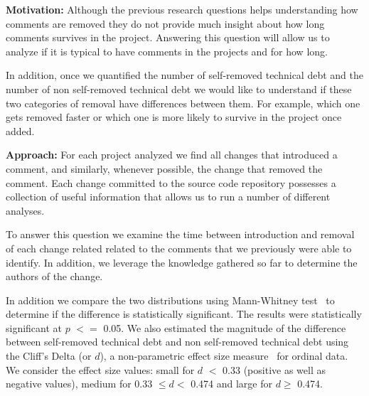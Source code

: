 
\vspace{2mm}
\noindent\rqiii

\noindent \textbf{Motivation:} Although the previous research questions helps understanding how \SATD comments are removed they do not provide much insight about how long \SATD comments survives in the project. Answering this question will allow us to analyze if it is typical to have \SATD comments in the projects and for how long.  

In addition, once we quantified the number of self-removed technical debt and the number of non self-removed technical debt we would like to understand if these two categories of removal have differences between them. For example, which one gets removed faster or which one is more likely to survive in the project once added. 

\vspace{1mm}
\noindent \textbf{Approach:} For each project analyzed we find all changes that introduced a \SATD comment, and similarly, whenever possible, the change that removed the \SATD comment. Each change committed to the source code repository possesses a collection of useful information  that allows us to run a number of different analyses. 

To answer this question we examine the time between introduction and removal of each change related related to the \SATD comments that we previously were able to identify. In addition, we leverage the knowledge gathered so far to determine the authors of the change. 


In addition we compare the two distributions using Mann-Whitney test~\cite{} to determine if the difference is statistically significant. The results were statistically significant at $p$ $<$$=$ 0.05. We also estimated the magnitude of the difference
between self-removed technical debt and non self-removed technical debt using the Cliff's Delta (or $d$), a
non-parametric effect size measure~\cite{} for ordinal data. We consider the effect size values: small for $d$ $<$ 0.33 (positive as well as negative values),
medium for 0.33  $\leq d<$ 0.474 and large for $d \geq$ 0.474.




